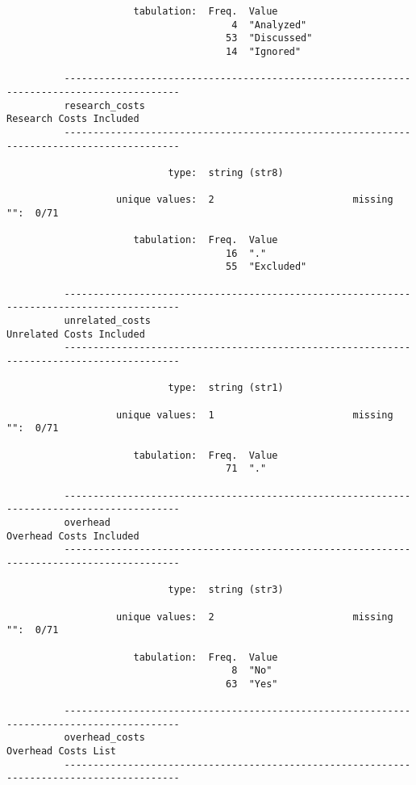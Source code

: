 \documentclass{article}
\begin{document}
\begin{verbatim}
                      tabulation:  Freq.  Value
                                       4  "Analyzed"
                                      53  "Discussed"
                                      14  "Ignored"
          
          ------------------------------------------------------------------------------------------
          research_costs                                                     Research Costs Included
          ------------------------------------------------------------------------------------------
          
                            type:  string (str8)
          
                   unique values:  2                        missing "":  0/71
          
                      tabulation:  Freq.  Value
                                      16  "."
                                      55  "Excluded"
          
          ------------------------------------------------------------------------------------------
          unrelated_costs                                                   Unrelated Costs Included
          ------------------------------------------------------------------------------------------
          
                            type:  string (str1)
          
                   unique values:  1                        missing "":  0/71
          
                      tabulation:  Freq.  Value
                                      71  "."
          
          ------------------------------------------------------------------------------------------
          overhead                                                           Overhead Costs Included
          ------------------------------------------------------------------------------------------
          
                            type:  string (str3)
          
                   unique values:  2                        missing "":  0/71
          
                      tabulation:  Freq.  Value
                                       8  "No"
                                      63  "Yes"
          
          ------------------------------------------------------------------------------------------
          overhead_costs                                                         Overhead Costs List
          ------------------------------------------------------------------------------------------
          

\end{verbatim}
\end{document}
